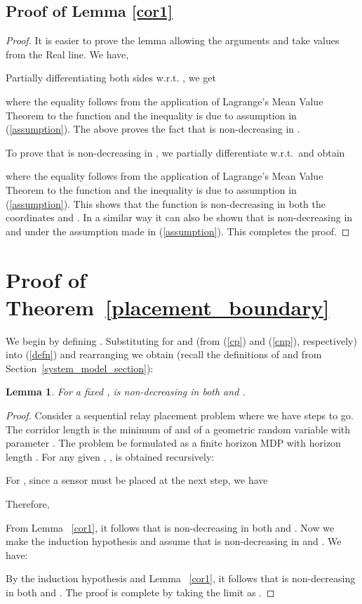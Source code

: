 \documentclass[conference]{IEEEtran}
\newtheorem{lemma}{Lemma}
\begin{document}
\subsection{Proof of Lemma \ref{cor1}}
\label{cor1_appendix}
\begin{proof}
It is easier to prove the lemma allowing the arguments  and  take values from the Real line. 
We have,

Partially differentiating both sides w.r.t. , we get

where the equality follows from the application of Lagrange's Mean Value Theorem to the function  and the inequality is due to assumption in (\ref{assumption}).
The above proves the fact that  is non-decreasing in . 

To prove that  is non-decreasing in , we partially differentiate  
w.r.t.\  and obtain
 
where the equality  follows from the application of Lagrange's Mean Value Theorem to the function  and the inequality is due to assumption in (\ref{assumption}).
This shows that the function  is non-decreasing in both the coordinates  and . In a similar way it can also be shown that  is non-decreasing in  and  under the assumption made in (\ref{assumption}). This completes the proof.
\end{proof}

\section{Proof of Theorem~\ref{placement_boundary}}
\label{placement_boundary_appendix}
We begin by defining . Substituting for 
 and  
(from (\ref{cp}) and (\ref{cnp}), respectively) into (\ref{defn}) and rearranging we obtain 
(recall the definitions of  and  from Section~\ref{system_model_section}):

\begin{lemma} 
\label{H}
For a fixed ,  is non-decreasing in both  and .
\end{lemma}
\begin{proof}
Consider a sequential relay placement problem where we have  steps to go. The corridor length is the minimum of  and of a geometric random variable with parameter . The problem be formulated as a finite horizon MDP with horizon length . For any given , ,  is obtained recursively: 

For , since a sensor must be placed at the next step, we have 

Therefore, 

From Lemma ~\ref{cor1}, it follows that  is non-decreasing in both  and .
Now we make the induction hypothesis and assume that  is non-decreasing in  and . We have:

By the induction hypothesis and Lemma ~\ref{cor1}, it follows that  is non-decreasing in both  and . The proof is complete by taking the limit as . 
\end{proof}
\end{document}
